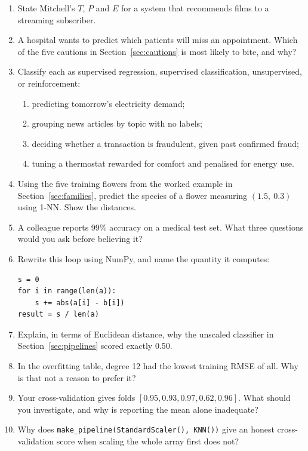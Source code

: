\documentclass[11pt]{article}
\begin{document}
\begin{enumerate}[leftmargin=*, label=\textbf{Q\arabic*.}]

\item State Mitchell's $T$, $P$ and $E$ for a system that recommends films to a
streaming subscriber.

\item\label{ex:hospital} A hospital wants to predict which patients will miss an
appointment. Which of the five cautions in Section~\ref{sec:cautions} is most
likely to bite, and why?

\item Classify each as supervised regression, supervised classification,
unsupervised, or reinforcement:
\begin{enumerate}[label=(\alph*)]
  \item predicting tomorrow's electricity demand;
  \item grouping news articles by topic with no labels;
  \item deciding whether a transaction is fraudulent, given past confirmed fraud;
  \item tuning a thermostat rewarded for comfort and penalised for energy use.
\end{enumerate}

\item Using the five training flowers from the worked example in
Section~\ref{sec:families}, predict the species of a flower measuring
$(1.5,\ 0.3)$ using 1-NN. Show the distances.

\item A colleague reports 99\% accuracy on a medical test set. What three
questions would you ask before believing it?

\item Rewrite this loop using NumPy, and name the quantity it computes:
\begin{lstlisting}
s = 0
for i in range(len(a)):
    s += abs(a[i] - b[i])
result = s / len(a)
\end{lstlisting}

\item Explain, in terms of Euclidean distance, why the unscaled classifier in
Section~\ref{sec:pipelines} scored exactly 0.50.

\item In the overfitting table, degree 12 had the lowest training RMSE of all.
Why is that not a reason to prefer it?

\item Your cross-validation gives folds
$[0.95, 0.93, 0.97, 0.62, 0.96]$. What should you investigate, and why is
reporting the mean alone inadequate?

\item Why does \texttt{make\_pipeline(StandardScaler(), KNN())} give an honest
cross-validation score when scaling the whole array first does not?

\end{enumerate}
\end{document}
